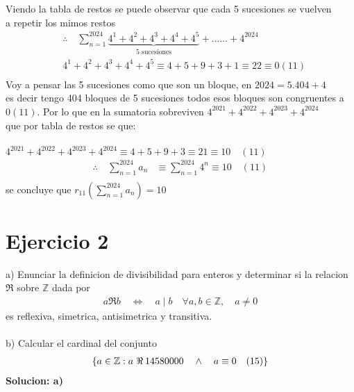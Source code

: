 \documentclass[a4paper]{article}
\begin{document}
Viendo la tabla de restos se puede observar que cada 5 sucesiones se vuelven \\
a repetir los mimos restos\\
\begin{align*}
&\therefore \quad \sum_{n=1}^{2024} \underbrace{4^1 + 4^2 + 4^3 + 4^4 + 4^5}_{\text{5 sucesiones}}  + \ldots \ldots  
+ 4^{2024} \\ 
&4^1 + 4^2 + 4^3 + 4^4 + 4^5 \equiv 4 + 5 + 9 + 3 + 1 \equiv 22 \equiv 0 (11) \\
\end{align*}
Voy a pensar las 5 sucesiones como que son un bloque, en $2024 = 5.404 + 4$ \\
es decir tengo 404 bloques de 5 sucesiones todos esos bloques son congruentes a $0 (11)$.
Por lo que en la sumatoria sobreviven $4^{2021} + 4^{2022} + 4^{2023} + 4^{2024}$ \\
que por tabla de restos se que: \\ \\ $4^{2021} + 4^{2022} + 4^{2023} + 4^{2024} \equiv 4 + 5
+ 9 + 3 \equiv 21 \equiv 10 \quad (11)$ \\
\begin{align*}
\therefore \quad \sum_{n=1}^{2024} a_n &\equiv \sum_{n=1}^{2024} 4^n \equiv 10 \quad (11) \\ 
\end{align*}
se concluye que  $r_{11}(\sum_{n=1}^{2024} a_n) = 10$

\section{Ejercicio 2}
a) Enunciar la definicion de divisibilidad para enteros y determinar si la relacion \\
$\Re$ sobre $\mathbb{Z}$ dada por
\begin{align*}
    a \Re b \quad \Longleftrightarrow \quad a \mid b \quad \forall a,b \in \mathbb{Z}, \quad a \neq 0
\end{align*}
es reflexiva, simetrica, antisimetrica y transitiva. \\ \\
b) Calcular el cardinal del conjunto
\begin{align*}
    \{a \in \mathbb{Z}: a \hspace{3px} \Re \hspace{2px}14580000 \quad \land \quad a \equiv 0 \quad(15)\}
\end{align*}
\textbf{Solucion: a)} \\
\end{document}
